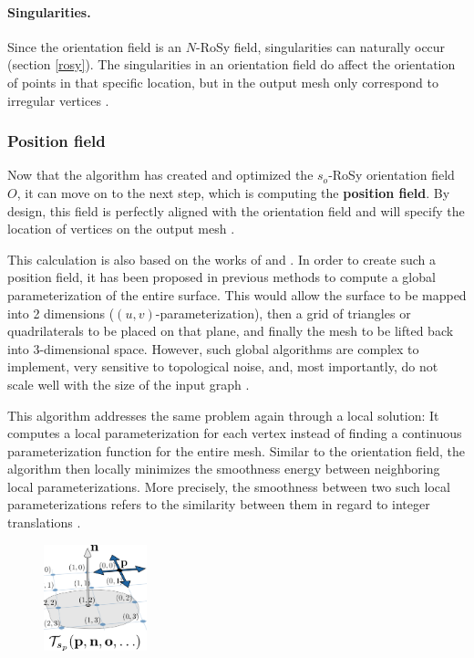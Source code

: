 \documentclass{ACGSeminar}
\begin{document}
\paragraph{Singularities.}
Since the orientation field is an $N$-RoSy field, singularities can naturally occur (section \ref{rosy}). The singularities in an orientation field do affect the orientation of points in that specific location, but in the output mesh only correspond to irregular vertices \cite{jakob2015instant}.

\subsubsection{Position field}
Now that the algorithm has created and optimized the $s_o$-RoSy orientation field $O$, it can move on to the next step, which is computing the \textbf{position field}. By design, this field is perfectly aligned with the orientation field and will specify the location of vertices on the output mesh \cite{jakob2015instant}.\bigskip

This calculation is also based on the works of \cite{bommes2009mixed} and \cite{ray2006periodic}. In order to create such a position field, it has been proposed in previous methods to compute a global parameterization of the entire surface. This would allow the surface to be mapped into 2 dimensions ($(u,v)$-parameterization), then a grid of triangles or quadrilaterals to be placed on that plane, and finally the mesh to be lifted back into 3-dimensional space. However, such global algorithms are complex to implement, very sensitive to topological noise, and, most importantly, do not scale well with the size of the input graph \cite{jakob2015instant}.\bigskip

This algorithm addresses the same problem again through a local solution: It computes a local parameterization for each vertex instead of finding a continuous parameterization function for the entire mesh. Similar to the orientation field, the algorithm then locally minimizes the smoothness energy between neighboring local parameterizations. More precisely, the smoothness between two such local parameterizations refers to the similarity between them in regard to integer translations \cite{jakob2015instant}.

\begin{figure}
	\includegraphics[width=3cm]{img/integer-translation.png}\par
	\label{fig:integer-translation}
\end{figure}
\end{document}
